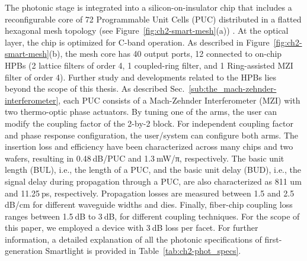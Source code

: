 The photonic stage is integrated into a silicon-on-insulator chip that includes a reconfigurable core of 72 Programmable Unit Cells (PUC) distributed in a flatted hexagonal mesh topology (see Figure~\ref{fig:ch2-smart-mesh}(a)) \cite{perez-lopez_general-purpose_2024}.
At the optical layer, the chip is optimized for C-band operation.
As described in Figure~\ref{fig:ch2-smart-mesh}(b), the mesh core has 40 output ports, 12 connected to on-chip HPBs (2 lattice filters of order 4, 1 coupled-ring filter, and 1 Ring-assisted MZI filter of order 4).
Further study and developments related to the HPBs lies beyond the scope of this thesis.
As described Sec.~\ref{sub:the_mach-zehnder-interferometer}, each PUC consists of a Mach-Zehnder Interferometer (MZI) with two thermo-optic phase actuators.
By tuning one of the arms, the user can modify the coupling factor of the 2-by-2 block.
For independent coupling factor and phase response configuration, the user/system can configure both arms.
The insertion loss and efficiency have been characterized across many chips and two wafers, resulting in 0.48 dB/PUC and 1.3 mW/π, respectively.
The basic unit length (BUL), i.e., the length of a PUC, and the basic unit delay (BUD), i.e., the signal delay during propagation through a PUC, are also characterized as 811 um and 11.25 ps, respectively.
Propagation losses are measured between 1.5 and 2.5 dB/cm for different waveguide widths and dies.
Finally, fiber-chip coupling loss ranges between 1.5 dB to 3 dB, for different coupling techniques.
For the scope of this paper, we employed a device with 3 dB loss per facet.
For further information, a detailed explanation of all the photonic specifications of first-generation Smartlight is provided in Table~\ref{tab:ch2-phot_specs}.


